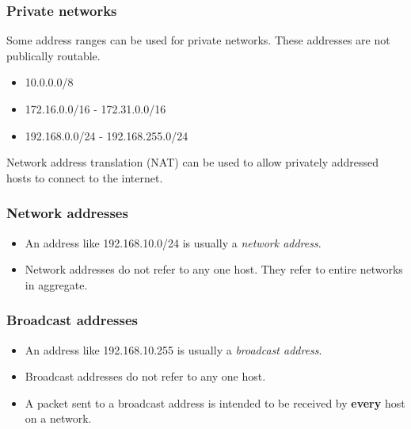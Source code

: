\documentclass[10pt]{beamer}
\begin{document}
\begin{frame}
  \frametitle{Private networks}
   
   Some address ranges can be used for private networks. These addresses
   are not publically routable.

 \begin{itemize}
  \item 10.0.0.0/8  
  \item 172.16.0.0/16 - 172.31.0.0/16 
  \item 192.168.0.0/24 - 192.168.255.0/24
 \end{itemize}
 Network address translation (NAT) can be used to allow privately addressed hosts to connect to the internet.

\end{frame}



\begin{frame}
  \frametitle{Network addresses}

 \begin{itemize}
  \item An address like 192.168.10.0/24 is usually a \emph{network address}. 
  \item Network addresses do not refer to any one host.  They refer to entire networks in aggregate.
 \end{itemize}

\end{frame}


\begin{frame}
  \frametitle{Broadcast addresses}

 \begin{itemize}
  \item An address like 192.168.10.255 is usually a \emph{broadcast address}.
  \item Broadcast addresses do not refer to any one host.  
  \item A packet sent to a broadcast address is intended to be received by \textbf{every} host on a network. 
 \end{itemize}
\end{frame}
\end{document}

